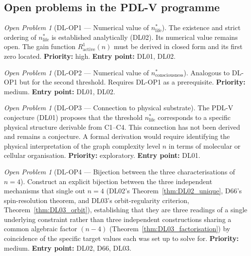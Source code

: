 \documentclass[11pt,a4paper]{article}
\theoremstyle{plain}
\theoremstyle{definition}
\theoremstyle{remark}
\newtheorem{openproblem}[theorem]{Open Problem}
\begin{document}
\subsection{Open problems in the PDL-V programme}

\begin{openproblem}[DL-OP1 --- Numerical value of $n^*_{\mathrm{life}}$]
\label{op:DL_nlife}
The existence and strict ordering of $n^*_{\mathrm{life}}$ is established analytically (DL02). Its numerical value remains open. The gain function $R^1_{\mathrm{active}}(n)$ must be derived in closed form and its first zero located. \textbf{Priority:} high. \textbf{Entry point:} DL01, DL02.
\end{openproblem}

\begin{openproblem}[DL-OP2 --- Numerical value of $n^*_{\mathrm{consciousness}}$]
\label{op:DL_nconsciousness}
Analogous to DL-OP1 but for the second threshold. Requires DL-OP1 as a prerequisite. \textbf{Priority:} medium. \textbf{Entry point:} DL01, DL02.
\end{openproblem}

\begin{openproblem}[DL-OP3 --- Connection to physical substrate]
\label{op:DL_substrate}
The PDL-V conjecture (DL01) proposes that the threshold $n^*_{\mathrm{life}}$ corresponds to a specific physical structure derivable from C1--C4. This connection has not been derived and remains a conjecture. A formal derivation would require identifying the physical interpretation of the graph complexity level $n$ in terms of molecular or cellular organisation. \textbf{Priority:} exploratory. \textbf{Entry point:} DL01.
\end{openproblem}

\begin{openproblem}[DL-OP4 --- Bijection between the three characterisations of $n=4$]
\label{op:DL_bijection}
Construct an explicit bijection between the three independent mechanisms that single out $n=4$ (DL02's Theorem~\ref{thm:DL02_unique}, D66's spin-resolution theorem, and DL03's orbit-regularity criterion, Theorem~\ref{thm:DL03_orbit}), establishing that they are three readings of a single underlying constraint rather than three independent constructions sharing a common algebraic factor $(n-4)$ (Theorem~\ref{thm:DL03_factorisation}) by coincidence of the specific target values each was set up to solve for. \textbf{Priority:} medium. \textbf{Entry point:} DL02, D66, DL03.
\end{openproblem}

\clearpage



\end{document}

